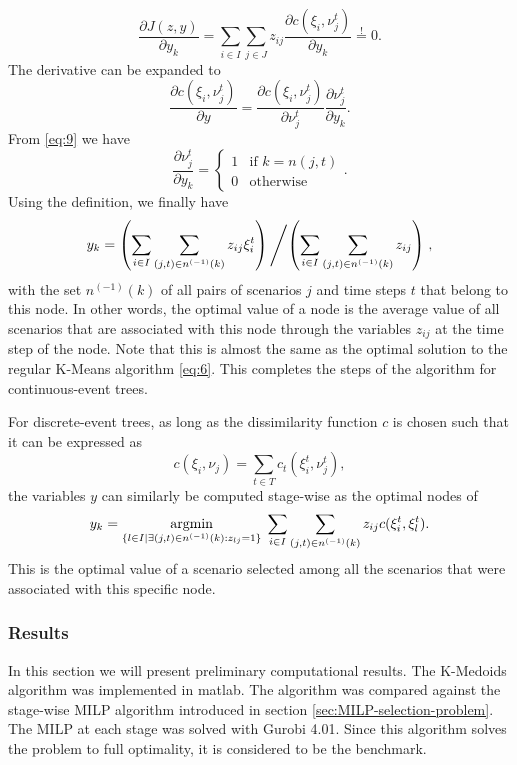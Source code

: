 \begin{equation}
  \label{eq:12}
  \frac{\partial J(z,y)}{\partial y_k} = \sum_{i\in I}\sum_{j\in J}z_{ij}\frac{\partial c(\xi_i, \nu_j^t)}{\partial y_k}\overset{!}{=} 0.
\end{equation}
The derivative can be expanded to
\begin{equation}
  \label{eq:13}
  \frac{\partial c(\xi_i, \nu_j^t)}{\partial y} = \frac{\partial c(\xi_i, \nu_j^t)}{\partial \nu_j^t}\frac{\partial \nu_j^t}{\partial y_k}.
\end{equation}
From \eqref{eq:9} we have
\begin{equation}
  \label{eq:14}
  \frac{\partial \nu_j^t}{\partial y_k} = 
  \left\{
    \begin{array}{ll}
      1&\text{if } k = n(j,t)\\0&\text{otherwise}
    \end{array}
  \right. .
\end{equation}
Using the definition, we finally have 
\begin{align}
  \label{eq:15}
  y_k = \left(\sum_{i\in I}\sum_{(j,t)\in n^{(-1)}(k)}z_{ij}\xi_i^t \right) \left / \left(\sum_{i\in I}\sum_{(j,t)\in n^{(-1)}(k)}z_{ij}\right)\right. ,
\end{align}
with the set $n^{(-1)}(k)$ of all pairs of scenarios $j$ and time steps $t$ that belong to this node.
In other words, the optimal value of a node is the average value of all scenarios that are associated with this node through the variables $z_{ij}$ at the time step of the node.
Note that this is almost the same as the optimal solution to the regular K-Means algorithm \eqref{eq:6}.
This completes the steps of the algorithm for continuous-event trees.

For discrete-event trees, as long as the dissimilarity function $c$ is chosen such that it can be expressed as 
\begin{equation}
  \label{eq:16}
  c(\xi_i, \nu_j) = \sum_{t\in T}c_t(\xi_i^t,\nu_j^t),
\end{equation}
the variables $y$ can similarly be computed stage-wise as the optimal nodes of 
\begin{equation}
  \label{eq:17}
  y_k = \underset{\{l\in I|\exists (j,t)\in n^{(-1)}(k):z_{lj}=1\} }{\operatorname{argmin}}\; \sum_{i\in I}\sum_{(j,t)\in n^{(-1)}(k)}z_{ij}c(\xi_i^t, \xi_l^t).
\end{equation}
This is the optimal value of a scenario selected among all the scenarios that were associated with this specific node.
\subsubsection{Results}
\label{sec:kmeans-results}
In this section we will present preliminary computational results. The K-Medoids  algorithm was implemented in {\sc matlab}.
The algorithm was compared against the stage-wise MILP algorithm introduced in section \ref{sec:MILP-selection-problem}.
The MILP at each stage was solved with Gurobi 4.01.
Since this algorithm solves the problem to full optimality, it is considered to be the benchmark.

